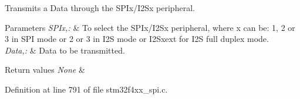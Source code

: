 Transmits a Data through the S\-P\-Ix/\-I2\-Sx peripheral. 


\begin{DoxyParams}{Parameters}
{\em S\-P\-Ix,\-:} & To select the S\-P\-Ix/\-I2\-Sx peripheral, where x can be\-: 1, 2 or 3 in S\-P\-I mode or 2 or 3 in I2\-S mode or I2\-Sxext for I2\-S full duplex mode. \\
\hline
{\em Data,\-:} & Data to be transmitted. \\
\hline
\end{DoxyParams}

\begin{DoxyRetVals}{Return values}
{\em None} & \\
\hline
\end{DoxyRetVals}


Definition at line 791 of file stm32f4xx\-\_\-spi.\-c.

